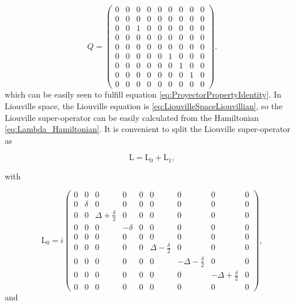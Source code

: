 \documentclass[12pt]{article}
\begin{document}
\begin{equation}
    Q = \begin{pmatrix}
    0&0&0&0&0&0&0&0&0 \\
    0&0&0&0&0&0&0&0&0 \\
    0&0&1&0&0&0&0&0&0 \\
    0&0&0&0&0&0&0&0&0 \\
    0&0&0&0&0&0&0&0&0 \\
    0&0&0&0&0&1&0&0&0 \\
    0&0&0&0&0&0&1&0&0 \\
    0&0&0&0&0&0&0&1&0 \\
    0&0&0&0&0&0&0&0&0 
    \end{pmatrix}.
\end{equation} which can be easily seen to fulfill equation \eqref{eq:ProyectorPropertyIdentity}. In Liouville space, the Liouville equation is \eqref{eq:LiouvilleSpaceLiouvillian}, so the Liouville super-operator can be easily calculated from the Hamiltonian \eqref{eq:Lambda_Hamiltonian}. It is convenient to split the Liouville super-operator as

\begin{equation}\label{eq:ThreeLevelAtomLiouvillian}
    \mathrm{L} = \mathrm{L}_0 + \mathrm{L}_1,
\end{equation}

with

\begin{equation} \label{}
   \mathrm{L}_0 = i\begin{pmatrix}0 & 0 & 0 & 0 & 0 & 0 & 0 & 0 & 0\\
0 & \delta  & 0 & 0 & 0 & 0 & 0 & 0 & 0\\
0 & 0 & \Delta+\frac{ \delta }{2}& 0 & 0 & 0 & 0 & 0 & 0\\
0 & 0 & 0 &  -\delta  & 0 & 0 & 0 & 0 & 0\\
0 & 0 & 0 & 0 & 0 & 0 & 0 & 0 & 0\\
0 & 0 & 0 & 0 & 0 & \Delta-\frac{ \delta }{2}  & 0 & 0 & 0\\
0 & 0 & 0 & 0 & 0 & 0 & -\Delta-\frac{ \delta }{2}  & 0 & 0\\
0 & 0 & 0 & 0 & 0 & 0 & 0 &  -\Delta +\frac{ \delta }{2} & 0\\
0 & 0 & 0 & 0 & 0 & 0 & 0 & 0 & 0\end{pmatrix},
\end{equation} and
\end{document}

